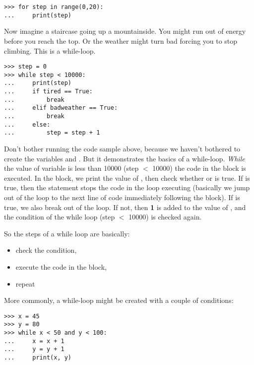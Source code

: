 \begin{listing}
\begin{verbatim}
>>> for step in range(0,20):
...     print(step)
\end{verbatim}
\end{listing}

Now imagine a staircase going up a mountainside.  You might run out of energy before you reach the top.  Or the weather might turn bad forcing you to stop climbing.  This is a while-loop.

\begin{listingignore}
\begin{verbatim}
>>> step = 0
>>> while step < 10000:
...     print(step)
...     if tired == True:
...         break
...     elif badweather == True:
...         break
...     else:
...         step = step + 1
\end{verbatim}
\end{listingignore}

Don't bother running the code sample above, because we haven't bothered to create the variables  and .  But it demonstrates the basics of a while-loop.  \emph{While} the value of variable  is less than 10000 (step $<$ 10000) the code in the block is executed.  In the block, we print the value of , then check whether  or  is true.  If  is true, then the  statement stops the code in the loop executing (basically we jump out of the loop to the next line of code immediately following the block).  If  is true, we also break out of the loop.  If not, then \textbf{1} is added to the value of , and the condition of the while loop (step $<$ 10000) is checked again.
\par
\noindent
So the steps of a while loop are basically:

{\renewcommand{\labelitemi}{$\triangleright$}
\begin{itemize}
\item check the condition,
\item execute the code in the block,
\item repeat
\end{itemize}}

More commonly, a while-loop might be created with a couple of conditions:

\begin{listing}
\begin{verbatim}
>>> x = 45
>>> y = 80
>>> while x < 50 and y < 100:
...     x = x + 1
...     y = y + 1
...     print(x, y)
\end{verbatim}
\end{listing}

